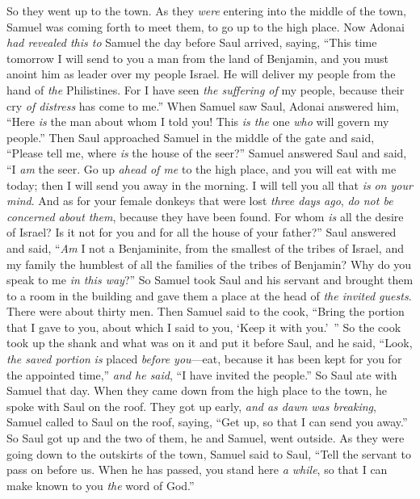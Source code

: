\begin{biblechapter}
\verse So they went up to the town. As they \textit{were} entering into the middle of the town, Samuel was coming forth to meet them, to go up to the high place.
\verse Now Adonai \textit{had revealed this to} Samuel the day before Saul arrived, saying,
\verse “This time tomorrow I will send to you a man from the land of Benjamin, and you must anoint him as leader over my people Israel. He will deliver my people from the hand of \textit{the} Philistines. For I have seen \textit{the suffering of} my people, because their cry \textit{of distress} has come to me.”
\verse When Samuel saw Saul, Adonai answered him, “Here \textit{is} the man about whom I told you! This \textit{is the} one \textit{who} will govern my people.”
\verse Then Saul approached Samuel in the middle of the gate and said, “Please tell me, where \textit{is} the house of the seer?”
\verse Samuel answered Saul and said, “I \textit{am} the seer. Go up \textit{ahead of me} to the high place, and you will eat with me today; then I will send you away in the morning. I will tell you all that \textit{is} \textit{on your mind}.
\verse And as for your female donkeys that were lost \textit{three days ago}, \textit{do not be concerned about them}, because they have been found. For whom \textit{is} all the desire of Israel? Is it not for you and for all the house of your father?”
\verse Saul answered and said, “\textit{Am} I not a Benjaminite, from the smallest of the tribes of Israel, and my family the humblest of all the families of the tribes of Benjamin? Why do you speak to me \textit{in this way}?”
\verse So Samuel took Saul and his servant and brought them to a room in the building and gave them a place at the head of \textit{the invited guests}. There were about thirty men.
\verse Then Samuel said to the cook, “Bring the portion that I gave to you, about which I said to you, ‘Keep it with you.’ ”
\verse So the cook took up the shank and what was on it and put it before Saul, and he said, “Look, \textit{the saved portion} \textit{is} placed \textit{before you}—eat, because it has been kept for you for the appointed time,” \textit{and he said}, “I have invited the people.” So Saul ate with Samuel that day.
\verse When they came down from the high place to the town, he spoke with Saul on the roof.
\verse They got up early, \textit{and as dawn was breaking}, Samuel called to Saul on the roof, saying, “Get up, so that I can send you away.” So Saul got up and the two of them, he and Samuel, went outside.
\verse As they were going down to the outskirts of the town, Samuel said to Saul, “Tell the servant to pass on before us. When he has passed, you stand here \textit{a while}, so that I can make known to you \textit{the} word of God.”
\end{biblechapter}

